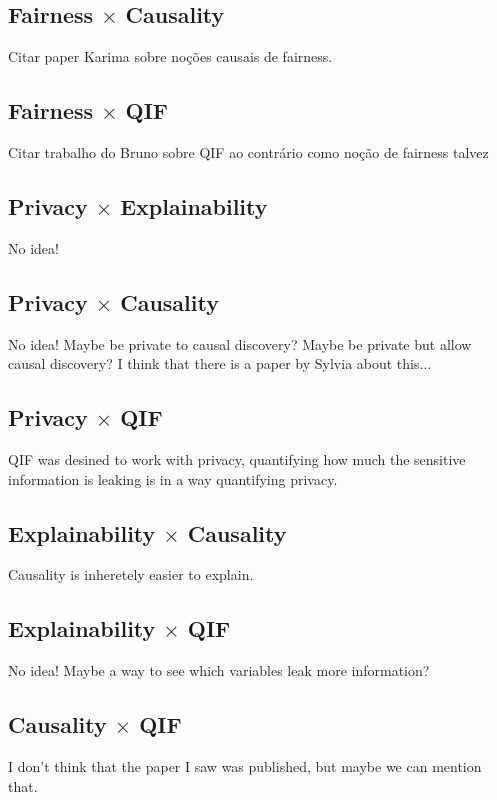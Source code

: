 \subsection{Fairness $\times$ Causality}

{\color{red} Citar paper Karima sobre noções causais de fairness.}

\subsection{Fairness $\times$ QIF}

{\color{red} Citar trabalho do Bruno sobre QIF ao contrário como noção de fairness talvez}

\subsection{Privacy $\times$ Explainability}

{\color{red} No idea!}

\subsection{Privacy $\times$ Causality}

{\color{red} No idea! Maybe be private to causal discovery? Maybe be private but allow causal discovery? I think that there is a paper by Sylvia about this...}

\subsection{Privacy $\times$ QIF}

{\color{red} QIF was desined to work with privacy, quantifying how much the sensitive information is leaking is in a way quantifying privacy.}

\subsection{Explainability $\times$ Causality}

{\color{red} Causality is inheretely easier to explain.}

\subsection{Explainability $\times$ QIF}

{\color{red} No idea! Maybe a way to see which variables leak more information?}

\subsection{Causality $\times$ QIF}

{\color{red} I don't think that the paper I saw was published, but maybe we can mention that.}


